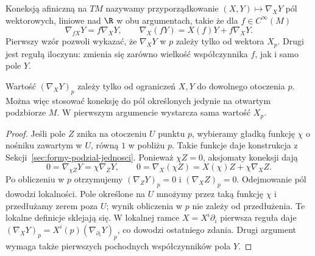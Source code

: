 \begin{definicja}
\label{def:koneksja-afiniczna}
Koneksją afiniczną na $TM$ nazywamy przyporządkowanie
$(X,Y)\mapsto\nabla_XY$ pól wektorowych, liniowe
nad $\R$ w obu argumentach, takie że dla $f\in C^\infty(M)$
\begin{equation}\label{eq:koneksja-aksjomaty}
 \nabla_{fX}Y=f\nabla_XY,
 \qquad \nabla_X(fY)=X(f)Y+f\nabla_XY.
\end{equation}
Pierwszy wzór pozwoli wykazać, że $\nabla_XY$ w $p$ zależy
tylko od wektora $X_p$. Drugi jest regułą iloczynu:
zmienia się zarówno wielkość współczynnika $f$,
jak i samo pole $Y$.
\end{definicja}

\begin{lemat}
\label{lem:koneksja-lokalnosc}
Wartość $(\nabla_XY)_p$ zależy tylko od ograniczeń $X,Y$
do dowolnego otoczenia $p$. Można więc stosować koneksję
do pól określonych jedynie na otwartym podzbiorze $M$.
W pierwszym argumencie wystarcza sama wartość $X_p$.
\end{lemat}
\begin{proof}
Jeśli pole $Z$ znika na otoczeniu $U$ punktu $p$, wybieramy
gładką funkcję $\chi$ o nośniku zawartym w $U$, równą $1$
w pobliżu $p$. Takie funkcje daje konstrukcja z
Sekcji~\ref{sec:formy-podzial-jednosci}. Ponieważ $\chi Z=0$,
aksjomaty koneksji dają
\[
 0=\nabla_{\chi Z}Y=\chi\nabla_ZY,\qquad
 0=\nabla_X(\chi Z)=X(\chi)Z+\chi\nabla_XZ.
\]
Po obliczeniu w $p$ otrzymujemy $(\nabla_ZY)_p=0$
i $(\nabla_XZ)_p=0$. Odejmowanie pól dowodzi lokalności.
Pole określone na $U$ mnożymy przez taką funkcję $\chi$
i przedłużamy zerem poza $U$; wynik obliczenia w $p$
nie zależy od przedłużenia. Te lokalne definicje sklejają się.
W lokalnej ramce $X=X^i\partial_i$ pierwsza reguła daje
$(\nabla_XY)_p=X^i(p)(\nabla_{\partial_i}Y)_p$,
co dowodzi ostatniego zdania. Drugi argument wymaga
także pierwszych pochodnych współczynników pola $Y$.
\end{proof}

